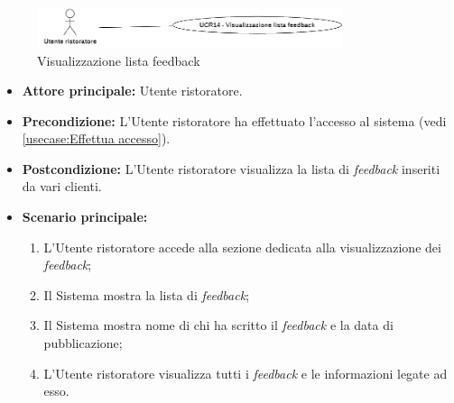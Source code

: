 \newpage
{}
\label{usecase:Visualizzazione lista feedback}

\begin{figure}[h]
	\centering
	\includegraphics[width=0.8\textwidth]{./uml/UCR14.png} 
	\caption{Visualizzazione lista feedback}
	\label{fig:UCR14}
  \end{figure}

\begin{itemize}
	\item \textbf{Attore principale:} Utente ristoratore.

	\item \textbf{Precondizione:} L'Utente ristoratore ha effettuato l'accesso al sistema (vedi \autoref{usecase:Effettua accesso}).

	\item \textbf{Postcondizione:} L'Utente ristoratore visualizza la lista di \textit{feedback} inseriti da vari clienti.


	\item \textbf{Scenario principale:}
	      \begin{enumerate}
		      \item L'Utente ristoratore accede alla sezione dedicata alla visualizzazione dei \textit{feedback};

		      \item Il Sistema mostra la lista di \textit{feedback};

		      \item Il Sistema mostra nome di chi ha scritto il \textit{feedback} e la data di pubblicazione;

		      \item L'Utente ristoratore visualizza tutti i \textit{feedback} e le informazioni legate ad esso.
	      \end{enumerate}
\end{itemize}
